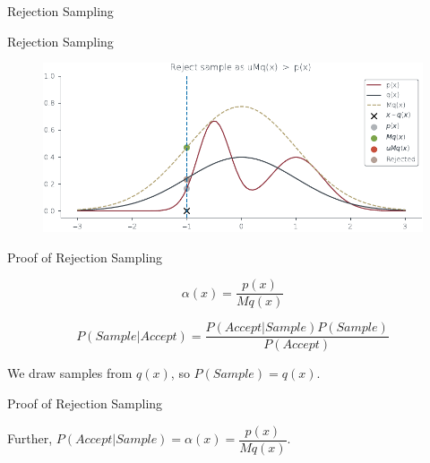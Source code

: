 \documentclass{beamer}
\begin{document}
\begin{section}{Rejection Sampling}
    \begin{frame}{Rejection Sampling}
        \begin{figure}
            \centering
            \includegraphics[scale = 0.75]{../figures/sampling/rejection-sampling--1.0-True-True-True-True-True-True-True-True.pdf}
        \end{figure}
    \end{frame}

    \begin{frame}{Proof of Rejection Sampling}
        \begin{tcolorbox}[colback=metropolisblue!5,colframe=metropolisblue,title={Acceptance Probability $\alpha(x)$}]
            \begin{equation}
              \alpha(x) = \frac{p(x)}{M q(x)}
            \end{equation}
        \end{tcolorbox}
       
        \begin{tcolorbox}[colback=metropolisblue!5,colframe=metropolisblue,title={Bayes Rule for Acceptance}]
            \begin{equation}
                P(Sample|Accept) = \frac{P(Accept|Sample) P(Sample)}{P(Accept)}
            \end{equation}
        \end{tcolorbox}

        \begin{tcolorbox}[colback=metropolisblue!5,colframe=metropolisblue,title={P(Sample)}]
            We draw samples from $q(x)$, so $P(Sample) = q(x)$.
        \end{tcolorbox}
    \end{frame}

    \begin{frame}{Proof of Rejection Sampling}

        Further, $P(Accept|Sample) = \alpha(x) = \dfrac{p(x)}{M q(x)}$.


\end{frame}
\end{section}
\end{document}
